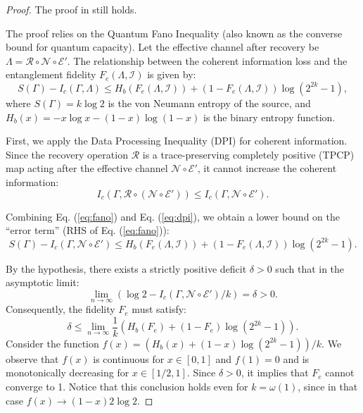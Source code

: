 \documentclass[twoside,english,aps,showpacs,pra,superscriptaddress]{revtex4-2}
\begin{document}
\begin{proof}
    The proof in \cite{zhaoExtractingErrorThresholds2024} still holds.
    
    The proof relies on the Quantum Fano Inequality (also known as the converse bound for quantum capacity). Let the effective channel after recovery be $\Lambda = \mathcal R \circ \mathcal N \circ \mathcal E'$. The relationship between the coherent information loss and the entanglement fidelity $F_e(\Lambda,\mathcal{I})$ is given by:
\begin{equation} \label{eq:fano}
    S(\Gamma) - I_c(\Gamma, \Lambda) \leq H_b(F_e(\Lambda,\mathcal{I})) + (1 - F_e(\Lambda,\mathcal{I})) \log(2^{2k} - 1),
\end{equation}
where $S(\Gamma) = k \log 2$ is the von Neumann entropy of the source, and $H_b(x) = -x\log x - (1-x)\log(1-x)$ is the binary entropy function.

First, we apply the Data Processing Inequality (DPI) for coherent information. Since the recovery operation $\mathcal R$ is a trace-preserving completely positive (TPCP) map acting after the effective channel $\mathcal N \circ \mathcal E'$, it cannot increase the coherent information:
\begin{equation} \label{eq:dpi}
    I_c(\Gamma, \mathcal R \circ (\mathcal N \circ \mathcal E')) \leq I_c(\Gamma, \mathcal N \circ \mathcal E').
\end{equation}

Combining Eq. (\ref{eq:fano}) and Eq. (\ref{eq:dpi}), we obtain a lower bound on the ``error term'' (RHS of Eq. (\ref{eq:fano})):
\begin{equation}
    S(\Gamma) - I_c(\Gamma, \mathcal N \circ \mathcal E') \leq H_b(F_e(\Lambda,\mathcal{I})) + (1 - F_e(\Lambda,\mathcal{I})) \log(2^{2k} - 1).
\end{equation}

By the hypothesis, there exists a strictly positive deficit $\delta > 0$ such that in the asymptotic limit:
\begin{equation}
    \lim_{n\to\infty} \left(  \log 2 - I_c(\Gamma, \mathcal N \circ \mathcal E') /k\right) = \delta>0.
\end{equation}
Consequently, the fidelity $F_e$ must satisfy:
\begin{equation}
    \delta \leq \lim_{n\to\infty} \frac{1}{k}\left(H_b(F_e) + (1 - F_e) \log(2^{2k} - 1)\right).
\end{equation}
Consider the function $f(x) = (H_b(x) + (1-x)\log(2^{2k} - 1))/k$. We observe that $f(x)$ is continuous for $x \in [0, 1]$ and $f(1) = 0$ and is monotonically decreasing for $x\in [1/2,1]$. Since $\delta > 0$, it implies that $F_e$ cannot converge to 1. Notice that this conclusion holds even for $k=\omega(1)$, since in that case $f(x) \rightarrow (1-x) 2\log2$.

\end{proof}
\end{document}
